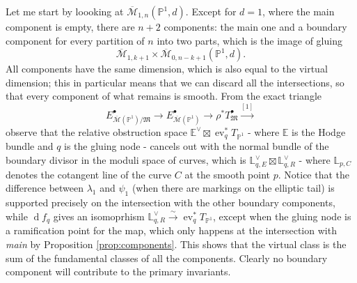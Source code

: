 \documentclass[11pt]{amsart}
\newcommand{\oM}{\overline{\mathcal{M}}}
\newcommand{\M}[4]{\overline{\mathcal{M}}_{#1,#2}(#3,#4)}
\newcommand{\PP}{\mathbb P}
\renewcommand{\to}{\rightarrow}
\newcommand{\MM}{\mathfrak M}
\newcommand{\ev}{\operatorname{ev}}
\theoremstyle{definition}
\theoremstyle{definition}
\begin{document}
Let me start by loooking at $\M{1}{n}{\PP^1}{d}$. Except for $d=1$, where the main component is empty, there are $n+2$ components: the main one and a boundary component for every partition of $n$ into two parts, which is the image of gluing \[\oM_{1,k+1}\times\M{0}{n-k+1}{\PP^1}{d}.\]
All components have the same dimension, which is also equal to the virtual dimension; this in particular means that we can discard all the intersections, so that every component of what remains is smooth. From the exact triangle
\[ E^\bullet_{\oM(\PP^1)/\MM}\to E^\bullet_{\oM(\PP^1)}\to \rho^*T^\bullet_{\MM}\overset{[1]}{\to}\]
observe that the relative obstruction space $\mathbb E^\vee\boxtimes \ev_q^*T_{\PP^1}$ - where $\mathbb E$ is the Hodge bundle and $q$ is the gluing node - cancels out with the normal bundle of the boundary divisor in the moduli space of curves, which is $\mathbb L_{q,E}^\vee\boxtimes \mathbb L_{q,R}^\vee$ - where $\mathbb L_{p,C}$ denotes the cotangent line of the curve $C$ at the smooth point $p$. Notice that the difference between $\lambda_1$ and $\psi_1$ (when there are markings on the elliptic tail) is supported precisely on the intersection with the other boundary components, while $\operatorname{d}\!f_q$ gives an isomoprhism $\mathbb L_{q,R}^\vee\xrightarrow{\sim}\ev_q^*T_{\PP^1}$, except when the gluing node is a ramification point for the map, which only happens at the intersection with \emph{main} by Proposition \ref{prop:components}. This shows that the virtual class is the sum of the fundamental classes of all the components. Clearly no boundary component will contribute to the primary invariants.
\end{document}
